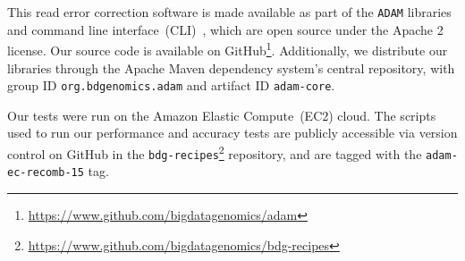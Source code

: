 \documentclass{llncs}
\begin{document}
This read error correction software is made available as part of the \texttt{ADAM} libraries and
command line interface~(CLI)~\cite{massie13}, which are open source under the Apache 2 license.
Our source code is available on GitHub\footnote{\url{https://www.github.com/bigdatagenomics/adam}}.
Additionally, we distribute our libraries through the Apache Maven dependency system's central
repository, with group ID \texttt{org.bdgenomics.adam} and artifact ID \texttt{adam-core}.

Our tests were run on the Amazon Elastic Compute~(EC2) cloud. The scripts used to run our
performance and accuracy tests are publicly accessible via version control on GitHub in the
\texttt{bdg-recipes}\footnote{\url{https://www.github.com/bigdatagenomics/bdg-recipes}} repository, and
are tagged with the \texttt{adam-ec-recomb-15} tag.



\end{document}
